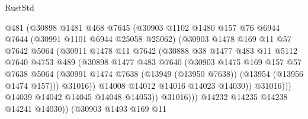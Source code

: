 \begin{lexlean}{RustStd}
\begin{coremodule}
                        @481
                        (@30898
                          @1481
                          @468
                          @7645
                          (@30903
                            @1102
                            @1480
                            @157
                            @76
                            @6944
                            @7644
                            (@30991 @1101 @6944 @25058 @25062)
                            (@30903
                              @1478
                              @169
                              @11
                              @57
                              @7642
                              @5064
                              (@30911
                                @1478
                                @11
                                @7642
                                (@30888
                                  @38
                                  @1477
                                  @483
                                  @11
                                  @5112
                                  @7640
                                  @4753
                                  @489
                                  (@30898
                                    @1477
                                    @483
                                    @7640
                                    (@30903
                                      @1475
                                      @169
                                      @157
                                      @57
                                      @7638
                                      @5064
                                      (@30991
                                        @1474
                                        @7638
                                        (@13949 (@13950 @7638))
                                        (@13954 (@13956 @1474 @157)))
                                      @31016))
                                  @14008
                                  @14012
                                  @14016
                                  @14023
                                  @14030))
                              @31016)))
                        @14039
                        @14042
                        @14045
                        @14048
                        @14053))
                    @31016)))
              @14232
              @14235
              @14238
              @14241
              @14030))
          (@30903
            @1493
            @169
            @11

\end{coremodule}
\end{lexlean}
